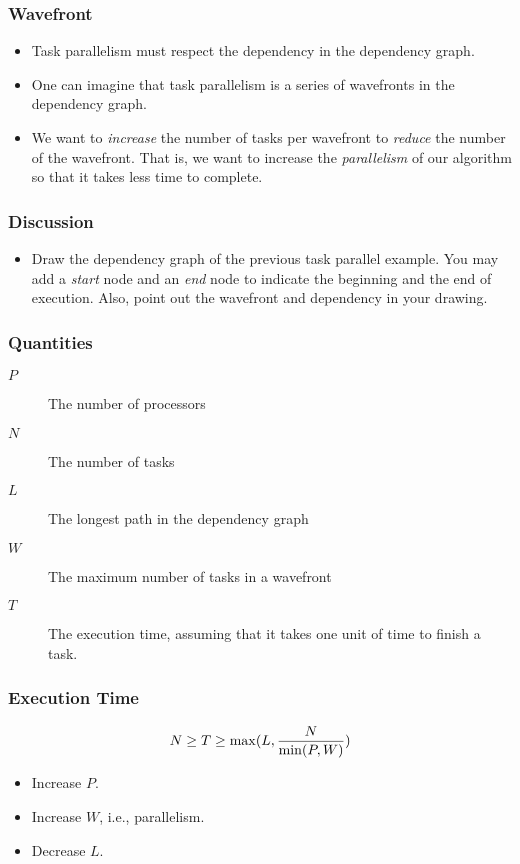 \documentclass{beamer}
\begin{document}
\begin{CJK}{UTF8}{bsmi}
  \begin{frame}
    \frametitle{Wavefront}
    \begin{itemize}
    \item Task parallelism must respect the dependency in the dependency graph.
    \item One can imagine that task parallelism is a series of wavefronts in the dependency graph.  
    \item We want to {\em increase} the number of tasks per wavefront to {\em reduce} the number of the wavefront. That is, we want to increase the {\em parallelism} of our algorithm so that it takes less time to complete.
    \end{itemize}
  \end{frame}

  \begin{frame}
    \frametitle{Discussion} 
    \begin{itemize}
    \item Draw the dependency graph of the previous task parallel example. You may add a {\em start} node and an {\em end} node to indicate the beginning and the end of execution. 
      Also, point out the wavefront and dependency in your drawing.
    \end{itemize}
  \end{frame}


  \begin{frame}
    \frametitle{Quantities} 
    \begin{description}
    \item [$P$] The number of processors
    \item [$N$] The number of tasks 
    \item [$L$] The longest path in the dependency graph
    \item [$W$] The maximum number of tasks in a wavefront
    \item [$T$] The execution time, assuming that it takes one unit of
      time to finish a task.
    \end{description}
  \end{frame}

  \begin{frame}
    \frametitle{Execution Time} 
    \begin{equation}
      N \geq T \ge \max(L, {N \over {\min(P, W)}})
    \end{equation}
    \begin{itemize}
    \item Increase $P$.
    \item Increase $W$, i.e., parallelism.
    \item Decrease $L$.
    \end{itemize}
  \end{frame}


\end{CJK}
\end{document}
